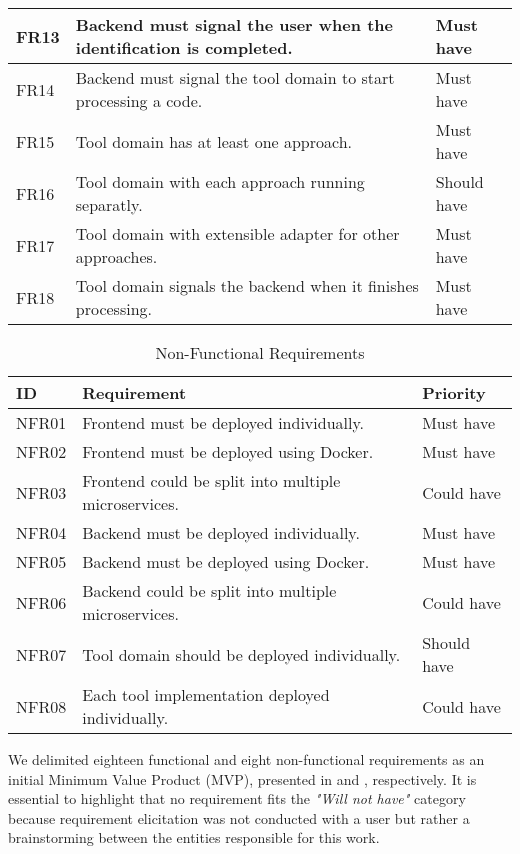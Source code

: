 \begin{table}[!htb]
\begin{center}
\begin{tabular}[c]{p{4em}|p{20em}|p{6em}}
      \hline FR13 & Backend must signal the user when the identification is completed. & {Must have} \\
      \hline FR14 & Backend must signal the tool domain to start processing a code. & {Must have} \\
      \hline FR15 & Tool domain has at least one approach. & {Must have} \\
      \hline FR16 & Tool domain with each approach running separatly. & {Should have} \\
      \hline FR17 & Tool domain with extensible adapter for other approaches. & {Must have} \\
      \hline FR18 & Tool domain signals the backend when it finishes processing. & {Must have} \\
    \end{tabular}
  \end{center}
\end{table}

\begin{table}[!htb] \caption{Non-Functional Requirements} \label{tab:non-functional-requirements}
  \begin{center}
    \begin{tabular}[c]{p{4em}|p{20em}|p{6em}}
      \textbf{ID} &
      \textbf{Requirement} &
      \textbf{Priority} \\
      \hline NFR01 & Frontend must be deployed individually. & {Must have} \\
      \hline NFR02 & Frontend must be deployed using Docker. & {Must have} \\
      \hline NFR03 & Frontend could be split into multiple microservices. & {Could have} \\
      \hline NFR04 & Backend must be deployed individually. & {Must have} \\
      \hline NFR05 & Backend must be deployed using Docker. & {Must have} \\
      \hline NFR06 & Backend could be split into multiple microservices. & {Could have} \\
      \hline NFR07 & Tool domain should be deployed individually. & {Should have} \\
      \hline NFR08 & Each tool implementation deployed individually. & {Could have} \\
    \end{tabular}
  \end{center}
\end{table}

We delimited eighteen functional and eight non-functional requirements as an
initial Minimum Value Product (MVP), presented in
 and ,
respectively. It is essential to highlight that no requirement fits the
\textit{"Will not have"} category because requirement elicitation was not
conducted with a user but rather a brainstorming between the entities
responsible for this work.
